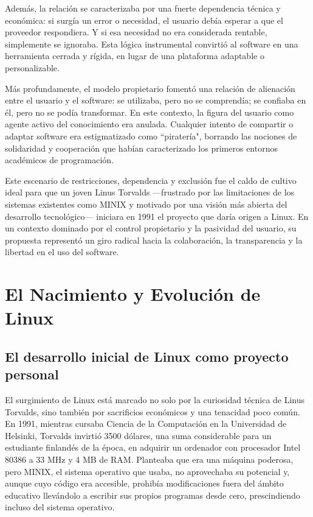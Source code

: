 \documentclass[a4paper,12pt]{article}
\begin{document}
Además, la relación se caracterizaba por una fuerte dependencia técnica y
económica: si surgía un error o necesidad, el usuario debía esperar a que el
proveedor respondiera. Y si esa necesidad no era considerada rentable,
simplemente se ignoraba. Esta lógica instrumental convirtió al software en una
herramienta cerrada y rígida, en lugar de una plataforma adaptable o
personalizable.

Más profundamente, el modelo propietario fomentó una relación de alienación
entre el usuario y el software: se utilizaba, pero no se comprendía; se confiaba
en él, pero no se podía transformar. En este contexto, la figura del usuario
como agente activo del conocimiento era anulada. Cualquier intento de compartir
o adaptar software era estigmatizado como ``piratería", borrando las nociones de
solidaridad y cooperación que habían caracterizado los primeros entornos
académicos de programación.

Este escenario de restricciones, dependencia y exclusión fue el caldo de cultivo
ideal para que un joven Linus Torvalds —frustrado por las limitaciones de los
sistemas existentes como MINIX y motivado por una visión más abierta del
desarrollo tecnológico— iniciara en 1991 el proyecto que daría origen a Linux.
En un contexto dominado por el control propietario y la pasividad del usuario,
su propuesta representó un giro radical hacia la colaboración, la transparencia
y la libertad en el uso del software.

\newpage
\section{El Nacimiento y Evolución de Linux} 

\subsection{El desarrollo inicial de Linux como proyecto personal}

El surgimiento de Linux está marcado no solo por la curiosidad técnica de Linus
Torvalds, sino también por sacrificios económicos y una tenacidad poco común. En
1991, mientras cursaba Ciencia de la Computación en la Universidad de Helsinki,
Torvalds invirtió 3500 dólares, una suma considerable para un estudiante
finlandés de la época, en adquirir un ordenador con procesador Intel 80386 a 33
MHz y 4 MB de RAM. Planteaba que era una máquina poderosa, pero MINIX, el
sistema operativo que usaba, no aprovechaba su potencial y, aunque cuyo código
era accesible, prohibía modificaciones fuera del ámbito educativo llevándolo a
escribir sus propios programas desde cero, prescindiendo incluso del sistema
operativo.
\end{document}
